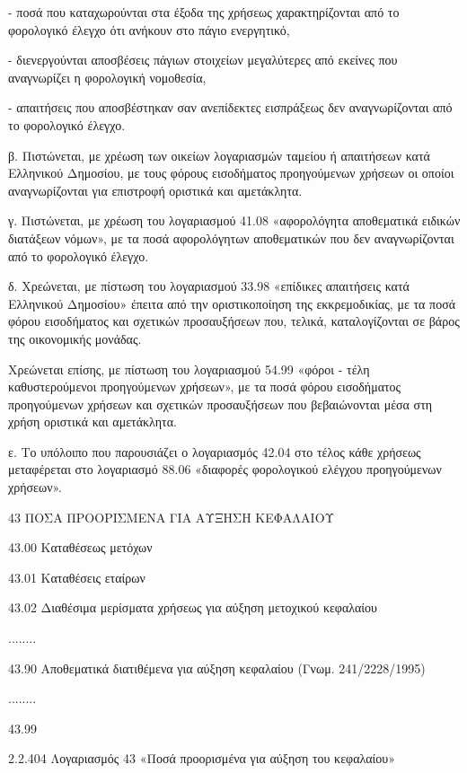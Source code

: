 \documentclass[A4,10pt,greek]{book}
\begin{document}
- ποσά που καταχωρούνται στα έξοδα της χρήσεως χαρακτηρίζονται από το φορολογικό έλεγχο ότι ανήκουν στο πάγιο ενεργητικό,

- διενεργούνται αποσβέσεις πάγιων στοιχείων μεγαλύτερες από εκείνες που αναγνωρίζει η φορολογική νομοθεσία,

- απαιτήσεις που αποσβέστηκαν σαν ανεπίδεκτες εισπράξεως δεν αναγνωρίζονται από το φορολογικό έλεγχο.

β. Πιστώνεται, με χρέωση των οικείων λογαριασμών ταμείου ή απαιτήσεων κατά Ελληνικού Δημοσίου, με τους φόρους εισοδήματος προηγούμενων χρήσεων οι οποίοι αναγνωρίζονται για επιστροφή οριστικά και αμετάκλητα.

γ. Πιστώνεται, με χρέωση του λογαριασμού 41.08 «αφορολόγητα αποθεματικά ειδικών διατάξεων νόμων», με τα ποσά αφορολόγητων αποθεματικών που δεν αναγνωρίζονται από το φορολογικό έλεγχο.

δ. Χρεώνεται, με πίστωση του λογαριασμού 33.98 «επίδικες απαιτήσεις κατά Ελληνικού Δημοσίου» έπειτα από την οριστικοποίηση της εκκρεμοδικίας, με τα ποσά φόρου εισοδήματος και σχετικών προσαυξήσεων που, τελικά, καταλογίζονται σε βάρος της οικονομικής μονάδας.

Χρεώνεται επίσης, με πίστωση του λογαριασμού 54.99 «φόροι - τέλη καθυστερούμενοι προηγούμενων χρήσεων», με τα ποσά φόρου εισοδήματος προηγούμενων χρήσεων και σχετικών προσαυξήσεων που βεβαιώνονται μέσα στη χρήση οριστικά και αμετάκλητα.

ε. Το υπόλοιπο που παρουσιάζει ο λογαριασμός 42.04 στο τέλος κάθε χρήσεως μεταφέρεται στο λογαριασμό 88.06 «διαφορές φορολογικού ελέγχου προηγούμενων χρήσεων».

 43   ΠΟΣΑ ΠΡΟΟΡΙΣΜΕΝΑ ΓΙΑ ΑΥΞΗΣΗ ΚΕΦΑΛΑΙΟΥ 

        43.00   Καταθέσεως μετόχων 

        43.01   Καταθέσεις εταίρων 

        43.02   Διαθέσιμα μερίσματα χρήσεως για αύξηση μετοχικού κεφαλαίου 

        ........

        43.90   Αποθεματικά διατιθέμενα για αύξηση κεφαλαίου
                    (Γνωμ. 241/2228/1995)

        ........

        43.99

2.2.404 Λογαριασμός 43 «Ποσά προορισμένα για αύξηση του κεφαλαίου»
\end{document}
